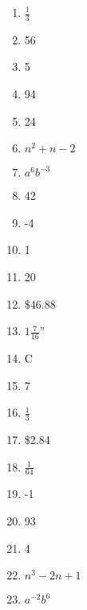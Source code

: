 \documentclass[../uilmath.tex]{subfiles}
\begin{document}
\begin{enumerate}[label=\bfseries\arabic*.]
    \item %
    $\frac{1}{3}$

    \item %
    56

    \item %
    5

    \item %
    94

    \item %
    24

    \item %
    $n^2+n-2$

    \item %
    $a^6b^{-3}$

    \item %
    42
    
    \item %
    -4

    \item %
    1

    \item %
    20

    \item %
    \$46.88

    \item %
    $1\frac{7}{16}$'' 

    \item %
    C 

    \item %
    7

    \item %
    $\frac{1}{3}$

    \item %
    \$2.84 

    \item %
    $\frac{1}{64}$

    \item %
    -1

    \item %
    93

    \item %
    4

    \item %
    $n^3-2n+1$

    \item %
    $a^{-2}b^6$


\end{enumerate}
\end{document}
